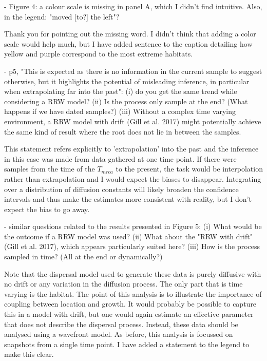 \documentclass[11pt, oneside]{article}   	%
\newcommand{\response}[1]{{\color{black}{\bf Response:} #1}}
\begin{document}
- Figure 4: a colour scale is missing in panel A, which I didn't find intuitive. Also, in the legend: "moved [to?] the left"?

\response{Thank you for pointing out the missing word. I didn't think that adding a color scale would help much, but I have added sentence to the caption detailing how yellow and purple correspond to the most extreme habitats.}


- p5, "This is expected as there is no information in the current sample to suggest otherwise, but it highlights the potential of misleading inference, in particular when extrapolating far into the past": (i) do you get the same trend while considering a RRW model? (ii) Is the process only sample at the end? (What happens if we have dated samples?) (iii) Without a complex time varying environment, a RRW model with drift (Gill et al. 2017) might potentially achieve the same kind of result where the root does not lie in between the samples.

\response{This statement refers explicitly to 'extrapolation' into the past and the inference in this case was made from data gathered at one time point. If there were samples from the time of the $T_{mrca}$ to the present, the task would be interpolation rather than extrapolation and I would expect the biases to disappear. Integrating over a distribution of diffusion constants will likely broaden the confidence intervals and thus make the estimates more consistent with reality, but I don't expect the bias to go away.}


- similar questions related to the results presented in Figure 5: (i) What would be the outcome if a RRW model was used? (ii) What about the "RRW with drift" (Gill et al. 2017), which appears particularly suited here? (iii) How is the process sampled in time? (All at the end or dynamically?)

\response{Note that the dispersal model used to generate these data is purely diffusive with no drift or any variation in the diffusion process. The only part that is time varying is the habitat. The point of this analysis is to illustrate the importance of coupling between location and growth. It would probably be possible to capture this in a model with drift, but one would again estimate an effective parameter that does not describe the dispersal process. Instead, these data should be analysed using a wavefront model. As before, this analysis is focussed on snapshots from a single time point. I have added a statement to the legend to make this clear.}
\end{document}
